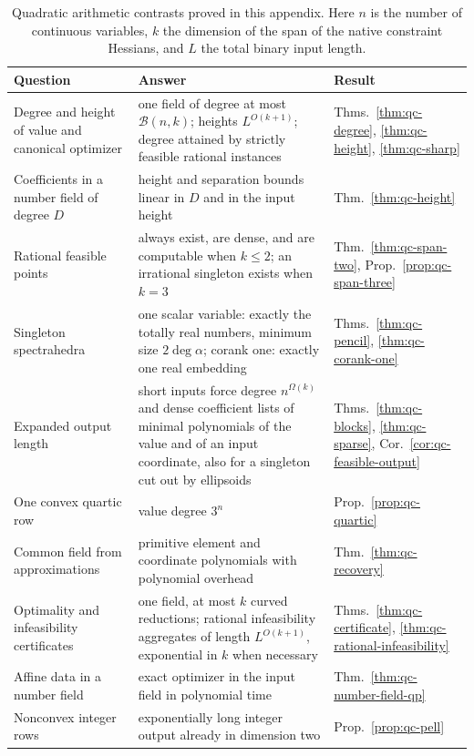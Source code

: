 \begin{table}[t]
\centering
\small
\begin{tabularx}{\textwidth}{@{}>{\raggedright\arraybackslash}p{3.6cm}
  >{\raggedright\arraybackslash}X
  >{\raggedright\arraybackslash}p{2.3cm}@{}}
\toprule
Question & Answer & Result\\
\midrule
Degree and height of value and canonical optimizer
 & one field of degree at most $\mathcal B(n,k)$; heights $L^{O(k+1)}$;
   degree attained by strictly feasible rational instances
 & Thms.~\ref{thm:qc-degree}, \ref{thm:qc-height}, \ref{thm:qc-sharp}\\
Coefficients in a number field of degree $D$
 & height and separation bounds linear in $D$ and in the input height
 & Thm.~\ref{thm:qc-height}\\
Rational feasible points
 & always exist, are dense, and are computable when $k\le2$; an irrational
   singleton exists when $k=3$
 & Thm.~\ref{thm:qc-span-two}, Prop.~\ref{prop:qc-span-three}\\
Singleton spectrahedra
 & one scalar variable: exactly the totally real numbers, minimum size
   $2\deg\alpha$; corank one: exactly one real embedding
 & Thms.~\ref{thm:qc-pencil}, \ref{thm:qc-corank-one}\\
Expanded output length
 & short inputs force degree $n^{\Omega(k)}$ and dense coefficient lists of
   minimal polynomials of the value and of an input coordinate, also for a
   singleton cut out by ellipsoids
 & Thms.~\ref{thm:qc-blocks}, \ref{thm:qc-sparse},
   Cor.~\ref{cor:qc-feasible-output}\\
One convex quartic row
 & value degree $3^n$
 & Prop.~\ref{prop:qc-quartic}\\
Common field from approximations
 & primitive element and coordinate polynomials with polynomial overhead
 & Thm.~\ref{thm:qc-recovery}\\
Optimality and infeasibility certificates
 & one field, at most $k$ curved reductions; rational infeasibility
   aggregates of length $L^{O(k+1)}$, exponential in $k$ when necessary
 & Thms.~\ref{thm:qc-certificate}, \ref{thm:qc-rational-infeasibility}\\
Affine data in a number field
 & exact optimizer in the input field in polynomial time
 & Thm.~\ref{thm:qc-number-field-qp}\\
Nonconvex integer rows
 & exponentially long integer output already in dimension two
 & Prop.~\ref{prop:qc-pell}\\
\bottomrule
\end{tabularx}
\caption{Quadratic arithmetic contrasts proved in this appendix. Here $n$ is
the number of continuous variables, $k$ the dimension of the span of the
native constraint Hessians, and $L$ the total binary input length.}
\label{tab:qc-summary}
\end{table}

